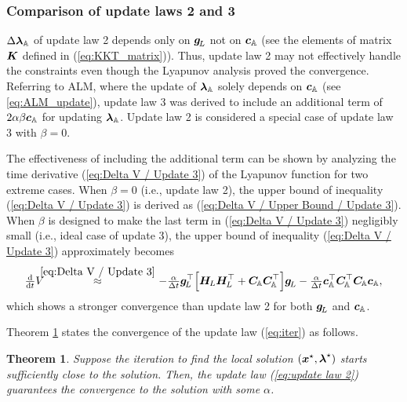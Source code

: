 \documentclass[journal]{IEEEtranTIE}
\newtheorem{theorem}{Theorem}
\begin{document}
\subsubsection{Comparison of update laws 2 and 3}
${\Delta \boldsymbol{\lambda}_{\mathbb{A}}}$ of update law 2 depends only on ${\boldsymbol{g}_{\!L}}$ not on ${\boldsymbol{c}_{\mathbb{A}}}$ (see the elements of matrix $\boldsymbol{K}$ defined in (\ref{eq:KKT_matrix})). Thus, update law 2 may not effectively handle the constraints even though the Lyapunov analysis proved the convergence. Referring to ALM, where the update of $\boldsymbol{\lambda}_{\mathbb{A}}$ solely depends on ${\boldsymbol{c}_{\mathbb{A}}}$ (see \ref{eq:ALM_update}), update law 3 was derived to include an additional term of $2\alpha\beta{\boldsymbol{c}_{\mathbb{A}}}$ for updating $\boldsymbol{\lambda}_{\mathbb{A}}$. Update law 2 is considered a special case of update law 3 with $\beta = 0$. 

The effectiveness of including the additional term can be shown by analyzing the time derivative (\ref{eq:Delta V / Update 3}) of the Lyapunov function for two extreme cases. When $\beta = 0$ (i.e., update law 2), the upper bound of inequality (\ref{eq:Delta V / Update 3}) is derived as (\ref{eq:Delta V / Upper Bound / Update 3}). When $\beta$ is designed to make the last term in (\ref{eq:Delta V / Update 3}) negligibly small (i.e., ideal case of update 3), the upper bound of inequality (\ref{eq:Delta V / Update 3}) approximately becomes
\begin{eqnarray}
\ddtsmall V & \!\!\!\! \stackrel{\eqref{eq:Delta V / Update 3}}{\approx} \!\!\!\!  & -\tfrac{\alpha}{\Delta t} \mv{g}_{\!L}^\top \Big[ \mm{H}_{\! L} \mm{H}_{\! L}^\top + \mm{C}_{\!\mathbb{A}} \mm{C}_{\!\mathbb{A}}^\top \Big] \mv{g}_{\!L} -\tfrac{\alpha}{\Delta t}  \mv{c}_{\mathbb{A}}^\top \mm{C}_{\!\mathbb{A}}^\top  \mm{C}_{\!\mathbb{A}} \mv{c}_{\mathbb{A}}, \notag
\end{eqnarray}
which shows a stronger convergence than update law 2 for both $\boldsymbol{g}_{\!L}$ and $\boldsymbol{c}_{\mathbb{A}}$.



Theorem \ref{thm:convergence} states the convergence of the update law (\ref{eq:iter}) as follows.
\begin{theorem}\label{thm:convergence}
Suppose the iteration to find the local solution $(\boldsymbol{x}^\star,\boldsymbol{\lambda}^\star)$ starts sufficiently close to the solution.
Then, the update law (\ref{eq:update law 2}) guarantees the convergence to the solution with some $\alpha$.
\end{theorem}
\end{document}
